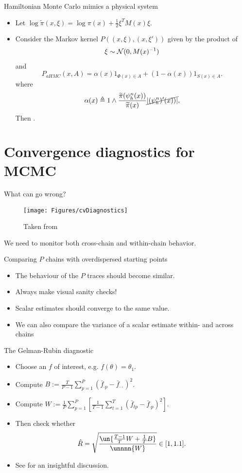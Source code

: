 \documentclass[10pt]{beamer}
\let\oldcitep=\citep
\renewcommand\citep[1]{\hyperlink{#1}{\textcolor{vert}{\oldcitep{#1}}}}
\def\tpi{\widetilde{\pi}}
\begin{document}
\begin{frame}{Hamiltonian Monte Carlo mimics a physical system}
  \begin{itemize}
    \item Let $\log \tpi(x, \xi) =  \log \pi(x) + \frac12 \xi^T M(x) \xi$.
    \item Consider the Markov kernel $P((x,\xi), (x,\xi'))$ given by the product of
    $$ \xi\sim \mathcal{N}(0,M(x)^{-1})$$
    and
    $$
    P_{aHMC}(x,A) = \alpha(x) 1_{\Phi(x)\in A} + (1-\alpha(x))1_{S(x)\in A}.
    $$
    where 
    \begin{equation}
      \alpha(x) \triangleq 1\wedge \frac{\tpi(\psi_h^n(x))}{\tpi(x)} \cancel{\vert (\psi_h^n)'(x))\vert},
    \end{equation}
    Then .
\end{itemize}
\blank
\end{frame}



\section{Convergence diagnostics for MCMC}
\begin{frame}{What can go wrong?}
\begin{figure}
\texttt{[image: Figures/cvDiagnostics]}
\caption{Taken from \citep{GCSDVR13}}
\end{figure}
We need to monitor both cross-chain and within-chain behavior.
\end{frame}

\begin{frame}{Comparing $P$ chains with overdispersed starting points}
\begin{itemize}
  \item The behaviour of the $P$ traces should become similar.
  \item Always make visual sanity checks!
  \item Scalar estimates should converge to the same value.
  \item We can also compare the variance of a scalar estimate within- and across chains
\end{itemize}

  \begin{block}{The Gelman-Rubin diagnostic}
  \begin{itemize}
    \item Choose an $f$ of interest, e.g. $f(\theta) = \theta_1$.
    \item Compute $B:=\frac{T}{P-1}\sum_{p=1}^P (\bar f_{\cdot p} - \bar f_{\cdot\cdot})^2$.
    \item Compute $W:=\frac1P \sum_{p=1}^P\left[ \frac{1}{T-1} \sum_{t=1}^T (\bar f_{tp}-\bar f_{\cdot p})^2\right].$
    \item Then check whether
    $$\hat R = \sqrt{\frac{\un{\frac{T-1}{T}W + \frac1T B}}{\unnnn{W}}}\in[1,1.1].$$
    \item See \citep{VaKn21} for an insightful discussion.
  \end{itemize}
\end{block}
\end{frame}
\end{document}
